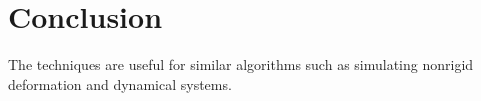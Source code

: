 \documentclass[10pt,conference]{IEEEtran}
\begin{document}




\section{Conclusion}
The techniques are
useful for similar algorithms such as simulating nonrigid deformation and
dynamical systems.














%
%





\end{document}
